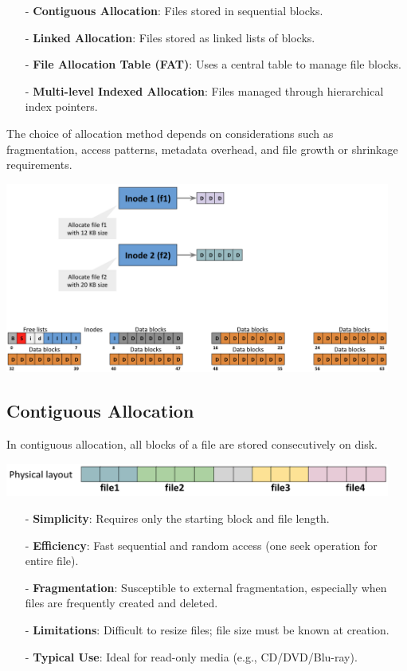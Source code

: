 \begin{itemize}[itemsep=2pt, topsep=1pt]
    \item[-] \textbf{Contiguous Allocation}: Files stored in sequential blocks.
    \item[-] \textbf{Linked Allocation}: Files stored as linked lists of blocks.
    \item[-] \textbf{File Allocation Table (FAT)}: Uses a central table to manage file blocks.
    \item[-] \textbf{Multi-level Indexed Allocation}: Files managed through hierarchical index pointers.
\end{itemize}

The choice of allocation method depends on considerations such as fragmentation, access patterns, metadata overhead, and file growth or shrinkage requirements.

\begin{center}
    \includegraphics[width=0.95\textwidth]{chapters/L6/images/alloc.png}
\end{center}
\newpage
\subsection{Contiguous Allocation}
In contiguous allocation, all blocks of a file are stored consecutively on disk.
\begin{center}
  \includegraphics[width=0.95\textwidth]{chapters/L6/images/contiguous.png}
\end{center}


\begin{itemize}[itemsep=2pt, topsep=1pt]
    \item[-] \textbf{Simplicity}: Requires only the starting block and file length.
    \item[-] \textbf{Efficiency}: Fast sequential and random access (one seek operation for entire file).
    \item[-] \textbf{Fragmentation}: Susceptible to external fragmentation, especially when files are frequently created and deleted.
    \item[-] \textbf{Limitations}: Difficult to resize files; file size must be known at creation.
    \item[-] \textbf{Typical Use}: Ideal for read-only media (e.g., CD/DVD/Blu-ray).
\end{itemize}

